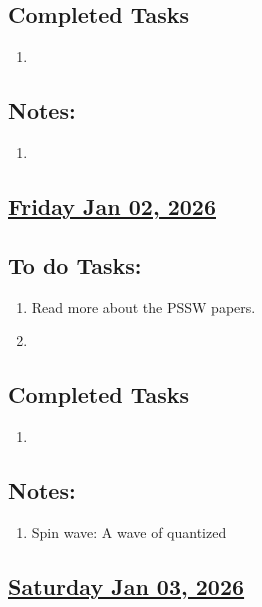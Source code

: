 \subsection*{Completed Tasks}
\begin{enumerate}[\ding{52}]  %
    \item 
\end{enumerate}
\subsection*{Notes:}
\begin{enumerate}
    \item 
\end{enumerate}
\subsection*{\underline{Friday Jan 02, 2026}}
\subsection*{To do Tasks:}
\begin{enumerate}
    \item Read more about the PSSW papers.
    \item 
\end{enumerate}

\subsection*{Completed Tasks}
\begin{enumerate}[\ding{52}]  %
    \item 
\end{enumerate}
\subsection*{Notes:}
\begin{enumerate}
    \item Spin wave: A wave of quantized
\end{enumerate}
\subsection*{\underline{Saturday Jan 03, 2026}}
